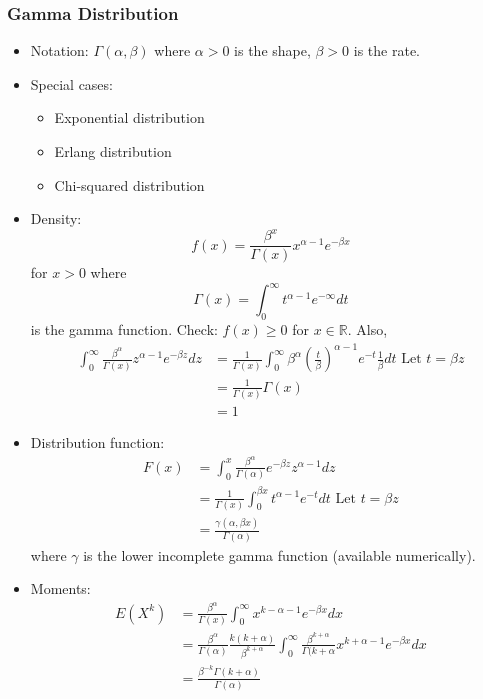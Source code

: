 \documentclass{article}
\newcommand{\R}{\mathbb{R}}
\begin{document}
		\subsubsection{Gamma Distribution}
		\begin{itemize}
					\item Notation: $\Gamma(\alpha, \beta)$ where $\alpha>0$ is the shape, $\beta>0$ is the rate.
					\item Special cases:
					\begin{itemize}
						\item Exponential distribution
						\item Erlang distribution
						\item Chi-squared distribution
					\end{itemize}
					\item Density: \[f(x)=\frac{\beta^x}{\Gamma(x)}x^{\alpha-1}e^{-\beta x}\] for $x>0$ where $$\Gamma(x)=\int_0^{\infty}t^{\alpha-1}e^{-\infty}dt$$ is the gamma function.
					Check: $f(x)\geq0$ for $x\in\R$. Also,
					\begin{align*}
						\int_0^{\infty}\frac{\beta^{\alpha}}{\Gamma(x)}z^{\alpha-1}e^{-\beta z}dz&=\frac{1}{\Gamma(x)}\int_0^{\infty}\beta^{\alpha}(\frac{t}{\beta})^{\alpha-1}e^{-t}\frac{1}{\beta}dt\mbox{ Let $t=\beta z$}\\
						&=\frac{1}{\Gamma(x)}\Gamma(x)\\
						&=1
					\end{align*}
					\item Distribution function:
							\begin{align*}
								F(x)&=\int_0^x\frac{\beta^{\alpha}}{\Gamma(\alpha)}e^{-\beta z}z^{\alpha-1}dz\\
								&=\frac{1}{\Gamma(x)}\int_0^{\beta x}t^{\alpha-1}e^{-t}dt\mbox{ Let $t=\beta z$}\\
								&=\frac{\gamma(\alpha, \beta x)}{\Gamma(\alpha)}
							\end{align*}
							where $\gamma$ is the lower incomplete gamma function (available numerically).
					\item Moments:
							\begin{align*}
								E(X^k)&=\frac{\beta^{\alpha}}{\Gamma(x)}\int_0^{\infty}x^{k-\alpha-1}e^{-\beta x}dx\\
								&=\frac{\beta^{\alpha}}{\Gamma(\alpha)}\frac{k(k+\alpha)}{\beta^{k+\alpha}}\int_0^{\infty}\frac{\beta^{k+\alpha}}{\Gamma(k+\alpha}x^{k+\alpha-1}e^{-\beta x}dx\\
								&=\frac{\beta^{-k}\Gamma(k+\alpha)}{\Gamma(\alpha)}\\

\end{align*}
\end{itemize}
\end{document}
